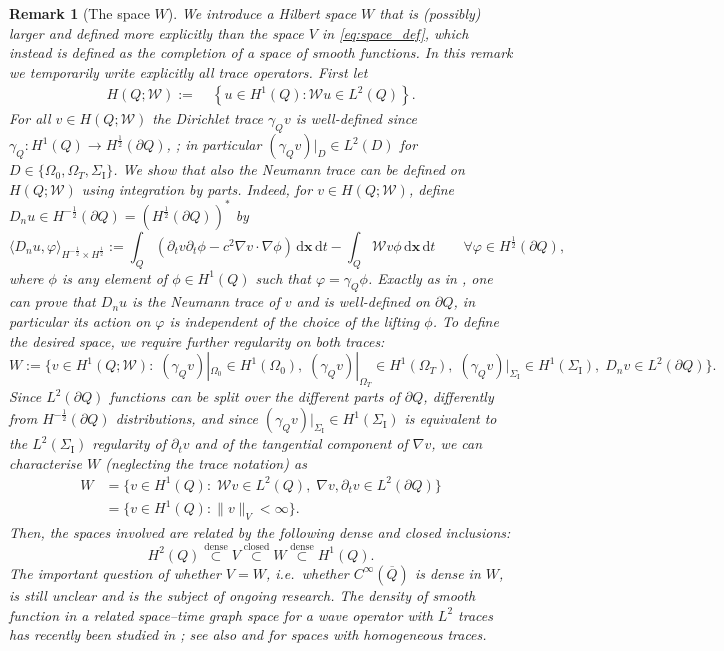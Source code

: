 \documentclass[a4paper]{article}
\theoremstyle{plain}
\newtheorem{remark}[theorem]{Remark}
\theoremstyle{definition}
\newcommand{\conj}[1]{\overline{#1}}
\newcommand{\operator}[1]{\mathcal{#1}}
\newcommand{\dx}{{\,\mathrm{d}\vect x}}
\newcommand{\dt}{{\,\mathrm{d}t}}
\newcommand{\Grad}[1]{\nabla #1}
\newcommand{\TimeDer}{{\partial^{}_t}}
\newcommand{\vect}[1]{\bm{#1}}
\newcommand{\SI}{{\Sigma_{\mathrm I}}}
\newcommand{\oW}{{\operator{W}}}
\newcommand{\OT}{{\Omega_T}}
\newcommand{\OZ}{{\Omega_0}}
\begin{document}
\begin{remark}[The space $W$]\label{remark:V=W?}
We introduce a Hilbert space $W$ that is (possibly) larger and defined more explicitly than the space $V$ in \eqref{eq:space_def}, which instead is defined as the completion of a space of smooth functions.
In this remark we temporarily write explicitly all trace operators.
First let
	\begin{align*}
		H(Q; \oW) :=\; & \left\{u \in H^1(Q): \oW u \in L^2(Q)\right\}.
\end{align*}
For all $v \in H(Q;\oW)$ the Dirichlet trace $\gamma_Q v$ is well-defined since $\gamma_Q:H^1(Q)\to H^{\frac12}(\partial Q)$, \cite[Thm.~3.37]{McLean00}; in particular  $(\gamma_Q v)|_D \in L^2(D)$ for $D \in \{\OZ, \OT, \SI\}$.
	We show that also the Neumann trace can be defined on $H(Q;\oW)$ using integration by parts.
	Indeed, for $v \in H(Q;\oW)$, define $D_n u\in H^{-\frac12}(\partial Q)=(H^{\frac12}(\partial Q))^*$ by
\begin{equation*}
		\langle D_n u , \varphi \rangle_{H^{-\frac12}\times H^{\frac12}} :=
		\int_Q (\TimeDer v \TimeDer \phi - c^2 \Grad v \cdot \Grad \phi) \dx \dt - \int_Q \oW v \phi \dx \dt \qquad \forall \varphi \in H^{\frac12}(\partial Q),
	\end{equation*}
	where $\phi$ is any element of $\phi \in H^1(Q)$ such that $\varphi = \gamma_Q \phi$.
	Exactly as in \cite[Lemma~4.3]{McLean00}, one can prove that $D_n u$ is the Neumann trace of $v$ and is well-defined on $\partial Q$, in particular its action on $\varphi$ is independent of the choice of the lifting $\phi$.
	To define the desired space, we require further regularity on both traces:
$$
		W:=\Big\{v\in H^1(Q;\oW):\; (\gamma_Qv)|_\OZ\in H^1(\OZ),\; (\gamma_Qv)|_\OT\in H^1(\OT),
		\; (\gamma_Qv)|_\SI\in H^1(\SI),
		\; D_n v\in L^2(\partial Q)\Big\}.
	$$
Since $L^2(\partial Q)$ functions can be split over the different parts of $\partial Q$, differently from $H^{-\frac12}(\partial Q)$ distributions, and since $(\gamma_Qv)|_\SI\in H^1(\SI)$ is equivalent to the $L^2(\SI)$ regularity of $\TimeDer v$ and of the tangential component of $\nabla v$,
	we can characterise $W$ (neglecting the trace notation) as
	\begin{align*}
		W & =\Big\{v\in H^1(Q):\;\oW v\in L^2(Q),\; \Grad v,\TimeDer v\in L^2(\partial Q)\Big\} \\
		  & =\Big\{v \in H^1(Q): \|v\|_V < \infty \Big\}.
	\end{align*}
Then, the spaces involved are related by the following dense and closed inclusions:
$$ H^2(Q) \overset{\text{dense}}\subset V\overset{\text{closed}}\subset W\overset{\text{dense}}\subset H^1(Q). $$
The important question of whether $V = W$, i.e.\ whether $C^\infty(\conj Q)$ is dense in $W$, is still unclear and is the subject of ongoing research.
The density of smooth function in a related space--time graph space for a wave operator with $L^2$ traces has recently been studied in \cite[Thm.~5.10]{BerggrenHagg2021}; see also \cite[Thm.~3.6]{FuhrerGonzalezKarkulik2025} and \cite[Thm.~4.1]{GopalakrishnanSepulveda2019} for spaces with homogeneous traces.
\end{remark}
\end{document}
